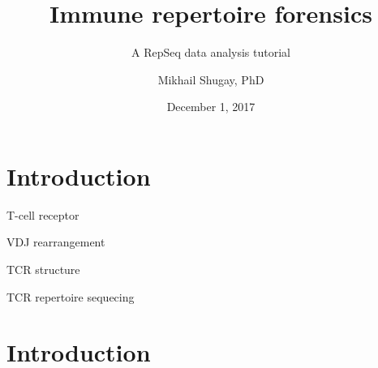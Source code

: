 \documentclass[12pt]{beamer}
\author{Mikhail Shugay, PhD}
\title{Immune repertoire forensics}
\subtitle{A RepSeq data analysis tutorial}
\institute[Skoltech]{\texttt {Skoltech MA03172 course [Term 2, 2017-2018]}}
\date{December 1, 2017}
\begin{document}
\maketitle

\section{Introduction}
\begin{frame}{T-cell receptor}

\end{frame}

\begin{frame}{VDJ rearrangement}

\end{frame}

\begin{frame}{TCR structure}

\end{frame}

\begin{frame}{TCR repertoire sequecing}

\end{frame}

\section{Introduction}
\end{document}
